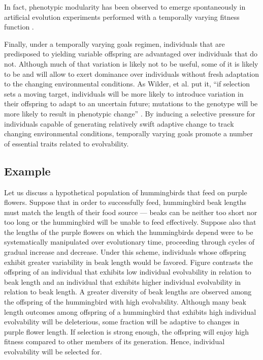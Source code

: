 In fact, phenotypic modularity has been observed to emerge spontaneously in artificial evolution experiments performed with a temporally varying fitness function \cite{Kashtan2007VaryingEvolution}.

Finally, under a temporally varying goals regimen, individuals that are predisposed to yielding variable offspring are advantaged over individuals that do not. Although much of that variation is likely not to be useful, some of it is likely to be and will allow to exert dominance over individuals without fresh adaptation to the changing environmental conditions. As Wilder, et al. put it, ``if selection sets a moving target, individuals will be more likely to introduce variation in their offspring to adapt to an uncertain future; mutations to the genotype will be more likely to result in phenotypic change'' \cite{Wilder2015ReconcilingEvolvability}. By inducing a selective pressure for individuals capable of generating relatively swift adaptive change to track changing environmental conditions, temporally varying goals promote a number of essential traits related to evolvability.

\subsection{Example}

Let us discuss a hypothetical population  of hummingbirds that feed on purple flowers.
Suppose that in order to successfully feed, hummingbird beak lengths must match the length of their food source --- beaks can be neither too short nor too long or the hummingbird will be unable to feed effectively.
Suppose also that the lengths of the purple flowers on which the hummingbirds depend were to be systematically manipulated over evolutionary time, proceeding through cycles of gradual increase and decrease.
Under this scheme, individuals whose offspring exhibit greater variability in beak length would be favored.
Figure  contrasts the offspring of an individual that exhibits low individual evolvability in relation to beak length and an individual that exhibits higher individual evolvability in relation to beak length.
A greater diversity of beak lengths are observed among the offspring of the hummingbird with high evolvability.
Although many beak length outcomes among offspring of a hummingbird that exhibits high individual evolvability will be deleterious, some fraction will be adaptive to changes in purple flower length.
If selection is strong enough, the offspring will enjoy high fitness compared to other members of its generation.
Hence, individual evolvability will be selected for.

